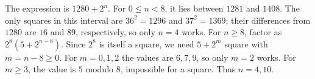 The expression is $1280+2^n$. For $0\le n<8$, it lies between $1281$ and $1408$. The only squares in this interval are $36^2=1296$ and $37^2=1369$; their differences from $1280$ are $16$ and $89$, respectively, so only $n=4$ works. For $n\ge8$, factor as $2^8(5+2^{n-8})$. Since $2^8$ is itself a square, we need $5+2^m$ square with $m=n-8\ge0$. For $m=0,1,2$ the values are $6,7,9$, so only $m=2$ works. For $m\ge3$, the value is $5$ modulo $8$, impossible for a square. Thus $\boxed{n=4,10}$.
